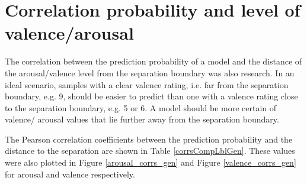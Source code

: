 

\section{Correlation probability and level of valence/arousal}

The correlation between the prediction probability of a model and the distance of the arousal/valence level from the separation boundary was also research. In an ideal scenario, samples with a clear valence rating, i.e. far from the separation boundary, e.g. 9, should be easier to predict than one with a valence rating close to the separation boundary, e.g. 5 or 6. A model should be more certain of valence/ arousal values that lie further away from the separation boundary.

\npar

The Pearson correlation coefficients between the prediction probability and the distance to the separation are shown in Table \ref{corrsCompLblGen}. These values were also plotted in Figure \ref{arousal_corrs_gen} and Figure \ref{valence_corrs_gen} for arousal and valence respectively.




